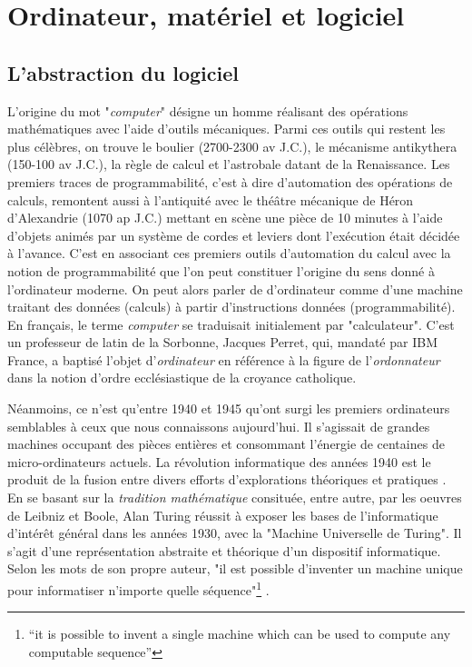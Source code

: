 \section{Ordinateur, matériel et logiciel} \label{1.1}

\subsection{L'abstraction du logiciel} \label{1.1.1}

L'origine du mot "\emph{computer}" désigne un homme réalisant des opérations mathématiques avec l'aide d'outils mécaniques. Parmi ces outils qui restent les plus célèbres, on trouve le boulier (2700-­2300 av J.­C.), le  mécanisme antikythera (150­-100 av J.­C.), la règle de calcul et l'astrobale datant de la Renaissance. Les  premiers   traces  de  programmabilité,  c'est  à  dire  d'automation  des  opérations   de calculs, remontent aussi à l'antiquité avec le théâtre mécanique de Héron d'Alexandrie (10­70 ap J.­C.) mettant en scène une pièce de 10 minutes à l'aide d'objets animés par un système de cordes et leviers dont l'exécution était décidée à l'avance. C'est en associant ces premiers outils d'automation du calcul avec la notion de programmabilité que l'on peut constituer l'origine du sens donné à l'ordinateur moderne. On peut alors parler de d'ordinateur comme d'une machine traitant des données (calculs) à partir d'instructions données (programmabilité). En français, le terme \emph{computer} se traduisait initialement par "calculateur". C'est un professeur de latin de la Sorbonne, Jacques Perret, qui, mandaté par IBM France, a baptisé l'objet d'\emph{ordinateur} en référence à la figure de l'\emph{ordonnateur} dans la notion d'ordre ecclésiastique de la croyance catholique.

Néanmoins, ce n'est qu'entre 1940 et 1945 qu'ont surgi les premiers ordinateurs semblables à ceux que nous connaissons aujourd'hui. Il s'agissait de grandes machines occupant des pièces entières et consommant l'énergie de centaines de micro-ordinateurs actuels. La révolution informatique des années 1940 est le produit de la fusion entre divers efforts d'explorations théoriques et pratiques \citep{Black2002}. En se basant sur la \emph{tradition mathématique} consituée, entre autre, par les oeuvres de Leibniz et Boole, Alan Turing réussit à exposer les bases de l'informatique d'intérêt général dans les années 1930, avec la "Machine Universelle de Turing". Il s'agit d'une représentation abstraite et théorique d'un dispositif informatique. Selon les mots de son propre auteur, "il est possible d'inventer un machine unique pour informatiser n'importe quelle séquence"\footnote{“it is possible to invent a single machine which can be used to compute any computable sequence”} \citep[p.241]{Turing1936}. 

